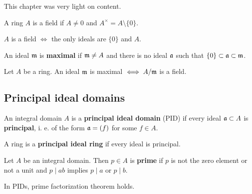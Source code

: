 This chapter was very light on content. 

\begin{definition}
    A ring $A$ is a field if $A\neq 0$ and $A^\times = A \setminus \{0\}$.
\end{definition}

\begin{lemma}
    $A$ is a field $\iff$ the only ideals are $\{0\}$ and $A$.
\end{lemma}

\begin{definition}
     An ideal $\mathfrak{m}$ is \textbf{maximal} if $\mathfrak{m} \neq A$ and there is no ideal $\mathfrak{a}$ such that $\{0\} \subset \mathfrak{a} \subset \mathfrak{m}$.
\end{definition}

\begin{corollary}
    Let $A$ be a ring. An ideal $\mathfrak{m}$ is maximal $\iff A/\mathfrak{m}$ is a field.
\end{corollary}

\subsection{Principal ideal domains}

\begin{definition}
    An integral domain $A$ is a \textbf{principal ideal domain} (PID) if every ideal $\mathfrak{a} \subset A$ is \textbf{principal}, i. e. of the form $\mathfrak{a} = (f)$ for some $f\in A$.
\end{definition}

\begin{definition}
    A ring is a \textbf{principal ideal ring} if every ideal is principal.
\end{definition}

\begin{definition}
    Let $A$ be an integral domain. Then $p\in A$ is \textbf{prime} if $p$ is not the zero element or not a unit and $p\mid ab$ implies $p\mid a$ or $p\mid b$.
\end{definition}

\begin{theorem}
    In PIDs, prime factorization theorem holds. 
\end{theorem}

